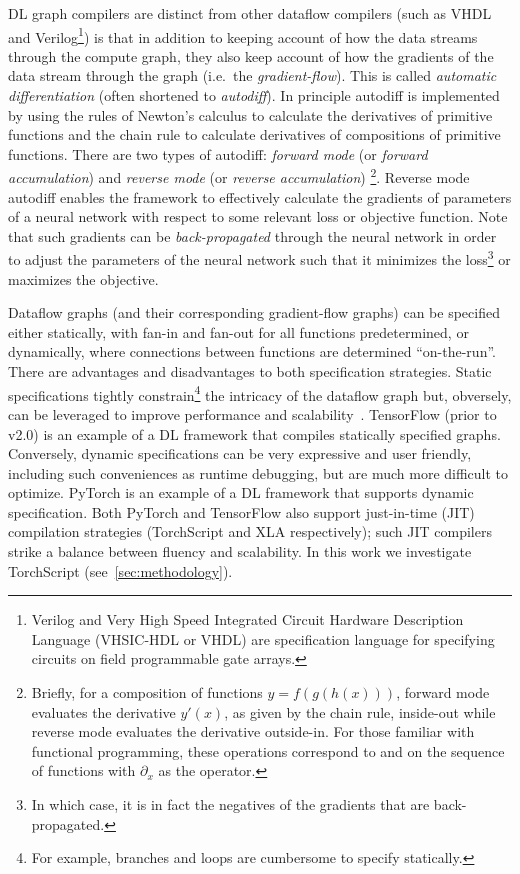 \documentclass[sigconf]{acmart}
\begin{document}
DL graph compilers are distinct from other dataflow compilers (such as VHDL and Verilog\footnote{Verilog and Very High Speed Integrated Circuit Hardware Description Language (VHSIC-HDL or VHDL) are specification language for specifying circuits on field programmable gate arrays.}) is that in addition to keeping account of how the data streams through the compute graph, they also keep account of how the gradients of the data stream through the graph (i.e.\ the \textit{gradient-flow}).
This is called \textit{automatic differentiation} (often shortened to \textit{autodiff}).
In principle autodiff is implemented by using the rules of Newton's calculus to calculate the derivatives of primitive functions and the chain rule to calculate derivatives of compositions of primitive functions.
There are two types of autodiff: \textit{forward mode} (or \textit{forward accumulation}) and \textit{reverse mode} (or \textit{reverse accumulation})%
\footnote{Briefly, for a composition of functions $y=f(g(h(x)))$, forward mode evaluates the derivative $y'(x)$, as given by the chain rule, inside-out while reverse mode evaluates the derivative outside-in. For those familiar with functional programming, these operations correspond to  and  on the sequence of functions with $\partial_x$ as the operator.}.
Reverse mode autodiff enables the framework to effectively calculate the gradients of parameters of a neural network with respect to some relevant loss or objective function.
Note that such gradients can be \textit{back-propagated} through the neural network in order to adjust the parameters of the neural network such that it minimizes the loss\footnote{In which case, it is in fact the negatives of the gradients that are back-propagated.} or maximizes the objective.

Dataflow graphs (and their corresponding gradient-flow graphs) can be specified either statically, with fan-in and fan-out for all functions predetermined, or dynamically, where connections between functions are determined ``on-the-run''.
There are advantages and disadvantages to both specification strategies.
Static specifications tightly constrain\footnote{For example, branches and loops are cumbersome to specify statically.} the intricacy of the dataflow graph but, obversely, can be leveraged to improve performance and scalability~\cite{le2019tflms,Pradelle2017PolyhedralOO}.
TensorFlow (prior to v2.0) is an example of a DL framework that compiles statically specified graphs.
Conversely, dynamic specifications can be very expressive and user friendly, including such conveniences as runtime debugging, but are much more difficult to optimize.
PyTorch is an example of a DL framework that supports dynamic specification.
Both PyTorch and TensorFlow also support just-in-time (JIT) compilation strategies (TorchScript and XLA respectively);
such JIT compilers strike a balance between fluency and scalability.
In this work we investigate TorchScript (see~\cref{sec:methodology}).
\end{document}
